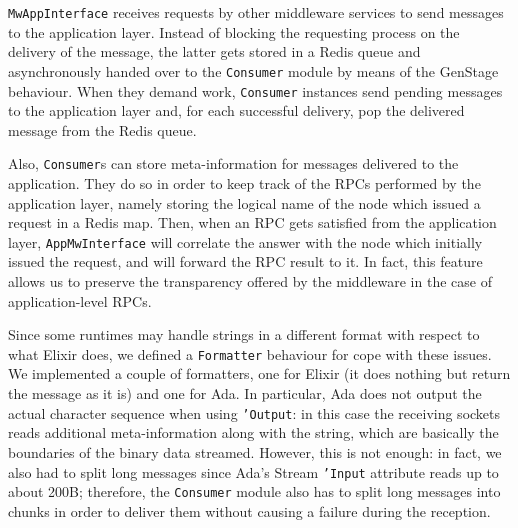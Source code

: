 \texttt{MwAppInterface} receives requests by other middleware services to send
messages to the application layer. Instead of blocking the requesting process
on the delivery of the message, the latter gets stored in a Redis queue and
asynchronously handed over to the \texttt{Consumer} module by means of the
GenStage behaviour. When they demand work, \texttt{Consumer} instances send
pending messages to the application layer and, for each successful delivery,
pop the delivered message from the Redis queue.

Also, \texttt{Consumer}s can store meta-information for messages delivered to
the application. They do so in order to keep track of the RPCs performed by the
application layer, namely storing the logical name of the node which issued a
request in a Redis map. Then, when an RPC gets satisfied from the
application layer, \texttt{AppMwInterface} will correlate the answer with the
node which initially issued the request, and will forward the RPC result to it.
In fact, this feature allows us to preserve the transparency offered by the
middleware in the case of application-level RPCs.

Since some runtimes may handle strings in a different format with respect to
what Elixir does, we defined a \texttt{Formatter} behaviour for cope with these
issues.
We implemented a couple of formatters, one for Elixir (it does nothing but
return the message as it is) and one for Ada. In particular, Ada does not
output the actual character sequence when using \texttt{'Output}: in this case
the receiving sockets reads additional meta-information along with the string,
which are basically the boundaries of the binary data streamed.
However, this is not enough: in fact, we also had to split long messages since
Ada's Stream \texttt{'Input} attribute reads up to about 200B; therefore, the
\texttt{Consumer} module also has to split long messages into chunks in order
to deliver them without causing a failure during the reception.

